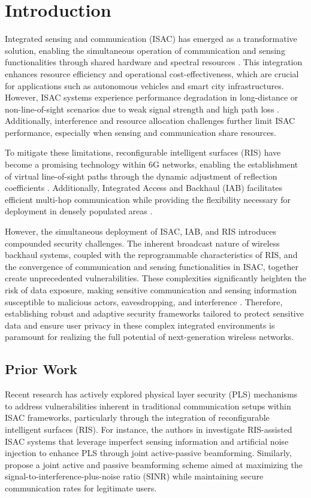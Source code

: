 \documentclass[journal]{IEEEtran}
\begin{document}
\section{Introduction}

Integrated sensing and communication (ISAC) has emerged as a transformative solution, enabling the simultaneous operation of communication and sensing functionalities through shared hardware and spectral resources \cite{Sun2024}. This integration enhances resource efficiency and operational cost-effectiveness, which are crucial for applications such as autonomous vehicles and smart city infrastructures. However, ISAC systems experience performance degradation in long-distance or non-line-of-sight scenarios due to weak signal strength and high path loss \cite{Kurma2024}. Additionally, interference and resource allocation challenges further limit ISAC performance, especially when sensing and communication share resources. 

To mitigate these limitations, reconfigurable intelligent surfaces (RIS) have become a promising technology within 6G networks, enabling the establishment of virtual line-of-sight paths through the dynamic adjustment of reflection coefficients \cite{Monteiro2022}. Additionally, Integrated Access and Backhaul (IAB) facilitates efficient multi-hop communication while providing the flexibility necessary for deployment in densely populated areas \cite{Tang2021}.

However, the simultaneous deployment of ISAC, IAB, and RIS introduces compounded security challenges. The inherent broadcast nature of wireless backhaul systems, coupled with the reprogrammable characteristics of RIS, and the convergence of communication and sensing functionalities in ISAC, together create unprecedented vulnerabilities. These complexities significantly heighten the risk of data exposure, making sensitive communication and sensing information susceptible to malicious actors, eavesdropping, and interference \cite{Wei2022}. Therefore, establishing robust and adaptive security frameworks tailored to protect sensitive data and ensure user privacy in these complex integrated environments is paramount for realizing the full potential of next-generation wireless networks.

\subsection{Prior Work}

Recent research has actively explored physical layer security (PLS) mechanisms to address vulnerabilities inherent in traditional communication setups within ISAC frameworks, particularly through the integration of reconfigurable intelligent surfaces (RIS). For instance, the authors in \cite{Jiang2025} investigate RIS-assisted ISAC systems that leverage imperfect sensing information and artificial noise injection to enhance PLS through joint active-passive beamforming. Similarly, \cite{Ye2025} propose a joint active and passive beamforming scheme aimed at maximizing the signal-to-interference-plus-noise ratio (SINR) while maintaining secure communication rates for legitimate users.
\end{document}
